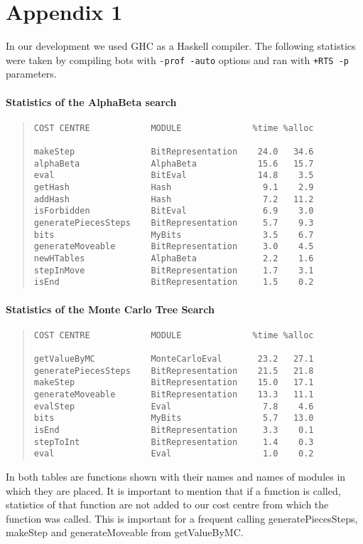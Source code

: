 \chapter{Appendix 1}\label{statistics}

In our development we used GHC as a Haskell compiler. The following statistics
were taken by compiling bots with \texttt{-prof -auto} options and ran with
\texttt{+RTS -p} parameters.

\subsubsection{Statistics of the AlphaBeta search}
\begin{quote}
\begin{verbatim}
COST CENTRE            MODULE              %time %alloc

makeStep               BitRepresentation    24.0   34.6
alphaBeta              AlphaBeta            15.6   15.7
eval                   BitEval              14.8    3.5
getHash                Hash                  9.1    2.9
addHash                Hash                  7.2   11.2
isForbidden            BitEval               6.9    3.0
generatePiecesSteps    BitRepresentation     5.7    9.3
bits                   MyBits                3.5    6.7
generateMoveable       BitRepresentation     3.0    4.5
newHTables             AlphaBeta             2.2    1.6
stepInMove             BitRepresentation     1.7    3.1
isEnd                  BitRepresentation     1.5    0.2
\end{verbatim}
\end{quote}

\subsubsection{Statistics of the Monte Carlo Tree Search}
\begin{quote}
\begin{verbatim}
COST CENTRE            MODULE              %time %alloc

getValueByMC           MonteCarloEval       23.2   27.1
generatePiecesSteps    BitRepresentation    21.5   21.8
makeStep               BitRepresentation    15.0   17.1
generateMoveable       BitRepresentation    13.3   11.1
evalStep               Eval                  7.8    4.6
bits                   MyBits                5.7   13.0
isEnd                  BitRepresentation     3.3    0.1
stepToInt              BitRepresentation     1.4    0.3
eval                   Eval                  1.0    0.2
\end{verbatim}
\end{quote}

In both tables are functions shown with their names and names of modules in
which they are placed. It is important to mention that if a function is called,
statistics of that function are not added to our cost centre from which the
function was called. This is important for a frequent calling
generatePiecesSteps, makeStep and generateMoveable from getValueByMC.

